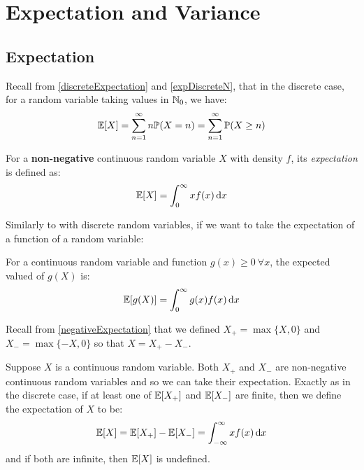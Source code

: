 \documentclass[../main.tex]{subfiles}
\begin{document}
\section{Expectation and Variance}
\subsection{Expectation}
\begin{remark}[Recap]
  Recall from \cref{discreteExpectation} and \cref{expDiscreteN}, that in the discrete case, for a random variable taking values in $\mathbb{N}_0$, we have:
  \[
    \mathbb{E}[X] = \sum_{n = 1}^{\infty} n \mathbb{P}(X = n) = \sum_{n = 1}^{\infty} \mathbb{P}(X \geq n)
  \]
\end{remark}
\begin{definition}
  For a \textbf{non-negative} continuous random variable $X$ with density $f$, its \textit{expectation} is defined as:
  \[
    \E[X] = \int_{0}^{\infty} xf(x) \d{x}
  \]
\end{definition}
Similarly to with discrete random variables, if we want to take the expectation of a function of a random variable:
\begin{theorem}
  For a continuous random variable and function $g(x) \geq 0\ \forall x$, the expected valued of $g(X)$ is:
  \label{expFunctionContinuous}
  \[
    \E[g(X)] = \int_{0}^{\infty} g(x)f(x) \d{x}
  \]
\end{theorem}
\begin{remark}[Recap]
  Recall from \cref{negativeExpectation} that we defined $X_{+} = \max\{X, 0\}$ and $X_{-} = \max\{-X, 0\}$ so that $X = X_{+} - X_{-}$.
\end{remark}
Suppose $X$ is a continuous random variable.
Both $X_{+}$ and $X_{-}$ are non-negative continuous random variables and so we can take their expectation.
Exactly as in the discrete case, if at least one of $\mathbb{E}[X_{+}]$ and $\mathbb{E}[X_{-}]$ are finite, then we define the expectation of $X$ to be:
\[
  \E[X] = \E[X_{+}] - \E[X_{-}] = \int_{-\infty}^{\infty} xf(x) \d{x}
\]
and if both are infinite, then $\mathbb{E}[X]$ is undefined.
\end{document}
